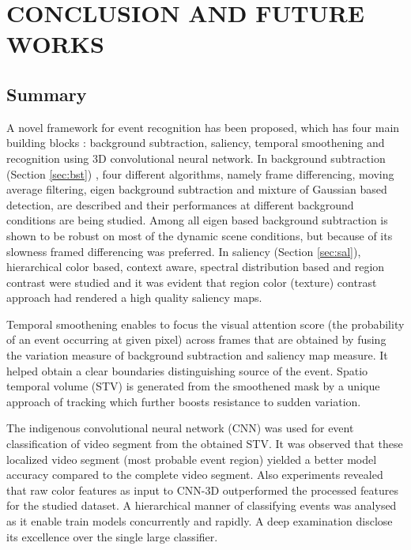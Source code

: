\chapter{CONCLUSION AND FUTURE WORKS}
\label{chap:concl}

\section{Summary}
A novel framework for event recognition has been proposed, which has four main building blocks : background subtraction, saliency, temporal smoothening and recognition using 3D convolutional neural network. In background subtraction (Section \ref{sec:bst}) , four different algorithms, namely frame differencing, moving average filtering, eigen background subtraction and mixture of Gaussian based detection, are described and their performances at different background conditions are being studied.  Among all eigen based background subtraction is shown to be robust on most of the dynamic scene conditions, but because of its slowness  framed differencing was preferred. In saliency (Section \ref{sec:sal}), hierarchical color based, context aware, spectral distribution based and region contrast were studied and it was evident that region color (texture) contrast approach had rendered a high quality saliency maps.

\par Temporal smoothening enables to focus the visual attention score (the probability of an event occurring at given pixel) across frames that are obtained by fusing the variation measure of background subtraction and saliency map measure. It helped obtain a clear boundaries distinguishing source of the event. Spatio temporal volume (STV) is generated from the smoothened mask by a unique approach of tracking which further boosts resistance to sudden variation.

\par The indigenous convolutional neural network (CNN) was used for event classification of video segment from the  obtained STV. It was observed that these localized video segment (most probable event region) yielded a better model accuracy compared to the complete video segment. Also experiments revealed that raw color features as input to CNN-3D outperformed the processed features for the studied dataset. A hierarchical manner of classifying events was analysed as it enable train models concurrently and rapidly. A deep examination disclose its excellence over the single large classifier. 

